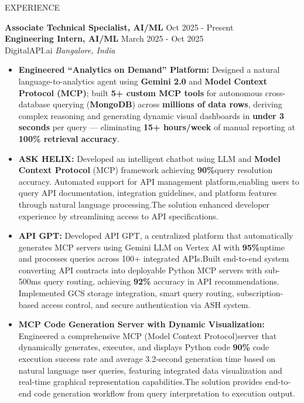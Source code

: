 \documentclass{resume} %
\begin{document}
\begin{rSection}{EXPERIENCE}

\textbf{Associate Technical Specialist, AI/ML} \hfill Oct 2025 - Present\\
\textbf{Engineering Intern, AI/ML} \hfill March 2025 - Oct 2025\\
DigitalAPI.ai \hfill \textit{Bangalore, India}
 \begin{itemize}
    \itemsep -3pt {} 
      \item \textbf{Engineered ``Analytics on Demand'' Platform:} Designed a natural language-to-analytics agent using \textbf{Gemini 2.0} and \textbf{Model Context Protocol (MCP)}; built \textbf{5+ custom MCP tools} for autonomous cross-database querying (\textbf{MongoDB}) across \textbf{millions of data rows}, deriving complex reasoning and generating dynamic visual dashboards in \textbf{under 3 seconds} per query — eliminating \textbf{15+ hours/week} of manual reporting at \textbf{100\% retrieval accuracy}.
     \item \textbf{ASK HELIX:} Developed an intelligent chatbot using LLM and \textbf{Model Context Protocol} (MCP) framework achieving \textbf{90\%}query resolution accuracy. Automated support for API management platform,enabling users to query API documentation, integration guidelines, and platform features through natural language processing.The solution enhanced developer experience by streamlining access to API specifications.
     \item \textbf{API GPT:} Developed API GPT, a centralized platform that automatically generates MCP servers using Gemini LLM on Vertex AI with \textbf{95\%}uptime and processes queries across 100+ integrated APIs.Built end-to-end system converting API contracts into deployable Python MCP servers with sub-500ms query routing, achieving \textbf{92\%} accuracy in API recommendations. Implemented GCS storage integration, smart query routing, subscription-based access control, and secure authentication via ASH system.
     \item \textbf{MCP Code Generation Server with Dynamic Visualization:} Engineered a comprehensive MCP (Model Context Protocol)server that dynamically generates, executes, and displays Python code \textbf{90\%} code execution success rate and average 3.2-second generation time based on natural language user queries, featuring integrated data visualization and real-time graphical representation capabilities.The solution provides end-to-end code generation workflow from query interpretation to execution output.
 \end{itemize}


\end{rSection}
\end{document}
